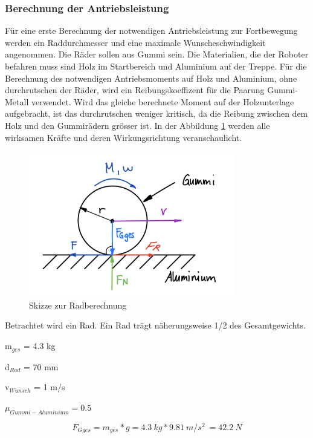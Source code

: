 \newpage

\subsubsection{Berechnung der Antriebsleistung}
Für eine erste Berechnung der notwendigen Antriebsleistung zur Fortbewegung werden ein Raddurchmesser und eine maximale Wunscheschwindigkeit angenommen. Die Räder sollen aus Gummi sein. Die Materialien, die der Roboter befahren muss sind Holz im Startbereich und Aluminium auf der Treppe. Für die Berechnung des notwendigen Antriebsmoments auf Holz und Aluminium, ohne durchrutschen der Räder, wird ein Reibungskoeffizent \cite{Reibung} für die Paarung Gummi-Metall verwendet. Wird das gleiche berechnete Moment auf der Holzunterlage aufgebracht, ist das durchrutschen weniger kritisch, da die Reibung zwischen dem Holz und den Gummirädern grösser ist. In der Abbildung \ref{fig:skizze-radberechnung} werden alle wirksamen Kräfte und deren Wirkungsrichtung veranschaulicht.

\begin{figure}[H]
  \includegraphics[width=0.8\textwidth]{img/Fortbewegung/Radberechnung.png}
  \centering
  \caption{Skizze zur Radberechnung}
  \label{fig:skizze-radberechnung}
\end{figure}

\newpage

Betrachtet wird ein Rad. Ein Rad trägt näherungsweise 1/2 des Gesamtgewichts.

m$_{ges}$ = 4.3 kg

d$_{Rad}$ = 70 mm

v$_{Wunsch}$ = 1 m/s

\( \mu_{Gummi-Aluminium} = 0.5\)

\[F_{Gges} = m_{ges} * g = 4.3\ kg * 9.81\ m/s^2\ = 42.2\ N \]

